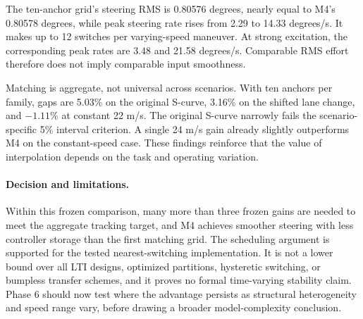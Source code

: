 The ten-anchor grid's steering RMS is 0.80576 degrees, nearly equal to M4's
0.80578 degrees, while peak steering rate rises from 2.29 to 14.33 degrees/s.
It makes up to 12 switches per varying-speed maneuver. At strong excitation,
the corresponding peak rates are 3.48 and 21.58 degrees/s. Comparable RMS
effort therefore does not imply comparable input smoothness.

Matching is aggregate, not universal across scenarios. With ten anchors per
family, gaps are 5.03\% on the original S-curve, 3.16\% on the shifted lane
change, and $-1.11\%$ at constant 22 m/s. The original S-curve narrowly fails
the scenario-specific 5\% interval criterion. A single 24 m/s gain already
slightly outperforms M4 on the constant-speed case. These findings reinforce
that the value of interpolation depends on the task and operating variation.

\paragraph{Decision and limitations.}
Within this frozen comparison, many more than three frozen gains are needed
to meet the aggregate tracking target, and M4 achieves smoother steering with
less controller storage than the first matching grid. The scheduling argument
is supported for the tested nearest-switching implementation. It is not a lower
bound over all LTI designs, optimized partitions, hysteretic switching, or
bumpless transfer schemes, and it proves no formal time-varying stability claim.
Phase 6 should now test where the advantage persists as structural heterogeneity
and speed range vary, before drawing a broader model-complexity conclusion.
